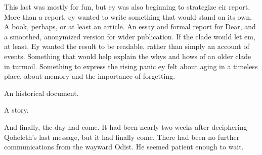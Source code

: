 This last was mostly for fun, but ey was also beginning to strategize eir report. More than a report, ey wanted to write something that would stand on its own. A book, perhaps, or at least an article. An essay and formal report for Dear, and a smoothed, anonymized version for wider publication. If the clade would let em, at least. Ey wanted the result to be readable, rather than simply an account of events. Something that would help explain the whys and hows of an older clade in turmoil. Something to express the rising panic ey felt about aging in a timeless place, about memory and the importance of forgetting.

An historical document.

A story.

And finally, the day had come. It had been nearly two weeks after deciphering Qoheleth's last message, but it had finally come. There had been no further communications from the wayward Odist. He seemed patient enough to wait.
